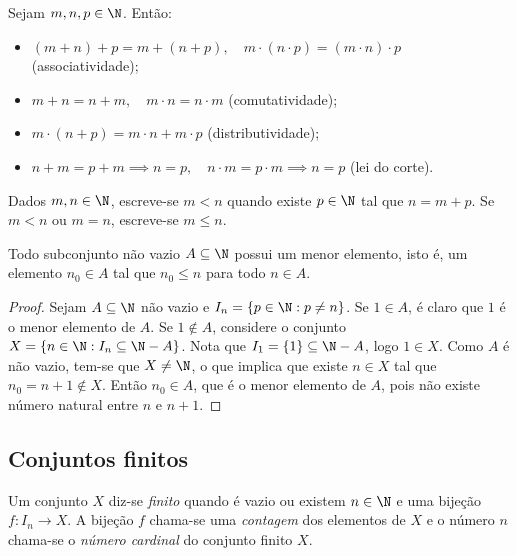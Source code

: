 \documentclass{article}
\begin{document}
\begin{prop} 
    Sejam \(m, n, p \in \N\). Então:
    \begin{itemize}
        \item[(i)] \((m+n)+p = m+(n+p), \quad m \cdot (n \cdot p) = (m \cdot n) \cdot p\) (associatividade);
        \item[(ii)] \(m + n = n + m, \quad m \cdot n = n \cdot m\) (comutatividade);
        \item[(iii)] \(m \cdot (n + p) = m \cdot n + m \cdot p\) (distributividade);
        \item[(iv)] \(n + m = p + m \implies n = p, \quad n \cdot m = p \cdot m \implies n = p\) (lei do corte).
    \end{itemize} 
\end{prop}

\begin{defn} [ordem em \(\N\)]
    Dados \(m, n \in \N\), escreve-se \(m < n\) quando existe \(p \in \N\) tal que \(n = m + p\). Se \(m < n\) ou \(m = n\), escreve-se \(m \leq n\).
\end{defn}

\begin{thm} 
    Todo subconjunto não vazio \(A \subseteq \N\) possui um menor elemento, isto é, um elemento \(n_0 \in A\) tal que \(n_0 \leq n\) para todo \(n \in A\).
\end{thm}

\begin{proof}
    Sejam \(A \subseteq \N\) não vazio e \(I_n = \{p \in \N: p \neq n\}\). Se \(1 \in A\), é claro que \(1\) é o menor elemento de \(A\). Se \(1 \notin A\), considere o conjunto \(X = \{n \in \N: I_n \subseteq \N - A\}\).
    Nota que \(I_1 = \{1\} \subseteq \N - A\), logo \(1 \in X\). Como \(A\) é não vazio, tem-se que \(X \neq \N\), o que implica que existe \(n \in X\) tal que \(n_0 = n+1 \notin X\). Então \(n_0 \in A\), que é o menor elemento de \(A\), pois não existe número natural entre \(n\) e \(n+1\).
\end{proof}

\subsection{Conjuntos finitos}

\begin{defn}
    Um conjunto \(X\) diz-se \emph{finito} quando é vazio ou existem \(n \in \N\) e uma bijeção \(f: I_n \to X\). A bijeção \(f\) chama-se uma \emph{contagem} dos elementos de \(X\) e o número \(n\) chama-se o \emph{número cardinal} do conjunto finito \(X\).
\end{defn}
\end{document}
